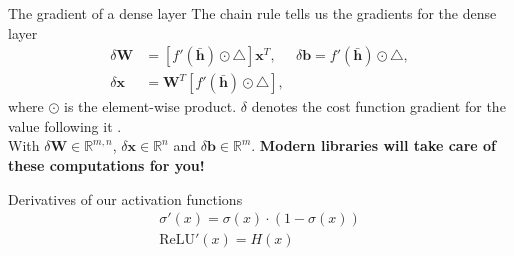 \documentclass{beamer}
\begin{document}
    \begin{frame}{The gradient of a dense layer}
      The chain rule tells us the gradients for the dense layer~\cite{nielsen2015neural}
      \begin{align}
        \delta \mathbf{W} &= [f'(\bar{\mathbf{h}}) \odot \triangle]\mathbf{x}^T, &  \delta \mathbf{b} = f'(\bar{\mathbf{h}}) \odot \triangle, \\
        \delta \mathbf{x} &= \mathbf{W}^T [f'(\bar{\mathbf{h}}) \odot \triangle],
      \end{align}
      where $\odot$ is the element-wise product. $\delta$ denotes the cost function gradient for the value following it \cite{greff2016lstm}. \\
      With $\delta \mathbf{W} \in \mathbb{R}^{m,n}$, $\delta \mathbf{x} \in \mathbb{R}^{n}$ and $\delta \mathbf{b} \in \mathbb{R}^{m}$.
      \textbf{Modern libraries will take care of these computations for you!} \\
      
    \end{frame}

    \begin{frame}{Derivatives of our activation functions}
      \begin{align}
        \sigma'(x) = \sigma(x) \cdot (1 - \sigma(x)) \\
        \text{ReLU}'(x) = H(x) 
      \end{align}
      \begin{figure}
        
        
      \end{figure}
    \end{frame}
\end{document}
